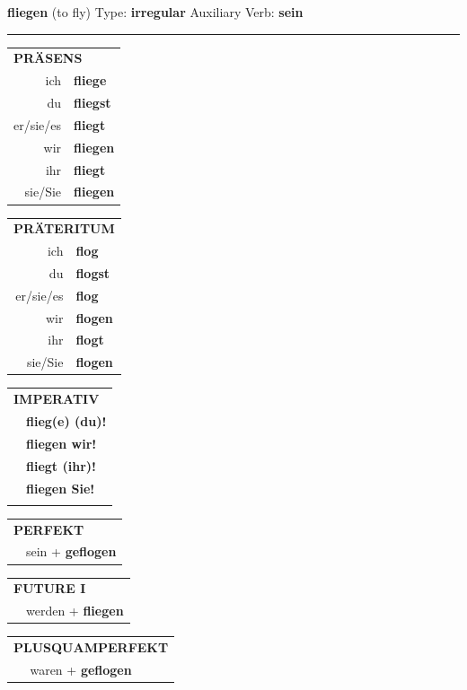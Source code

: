 \documentclass[10pt,a4paper]{revtex4-2}
\begin{document}
\begin{verbbox}
    {\Large \bf fliegen} (to fly) \hfill Type: \textbf{irregular} \hfill Auxiliary Verb: \textbf{sein} 
    
     \vspace{5pt}

    \hrule
    
    \vspace{5pt}

  \begin{tabular}{rl}
     \multicolumn{2}{l}{\textbf{PRÄSENS} }\\
    ich & \textbf{fliege}\\
    du & \textbf{fliegst}\\
    er/sie/es & \textbf{fliegt}\\
    wir & \textbf{fliegen}\\
    ihr & \textbf{fliegt}\\
    sie/Sie & \textbf{fliegen}\\
  \end{tabular}
  \hfill
     \begin{tabular}{rl}
    \multicolumn{2}{l}{\textbf{PRÄTERITUM} }\\
    ich & \textbf{flog}\\
    du & \textbf{flogst}\\
    er/sie/es & \textbf{flog}\\
    wir & \textbf{flogen}\\
    ihr & \textbf{flogt}\\
    sie/Sie & \textbf{flogen}\\
  \end{tabular}
  \hfill
  \begin{tabular}{rl}
     \multicolumn{2}{l}{\textbf{IMPERATIV} }\\
   & \textbf{flieg(e) (du)!}\\
   & \textbf{fliegen wir!}\\
   & \textbf{fliegt (ihr)!}\\
   & \textbf{fliegen Sie!}\\
   & \vspace{10pt}
  \end{tabular}

    \vspace{10pt}

 \begin{tabular}{rl}
     \multicolumn{2}{l}{\textbf{PERFEKT}}\\
   & sein + \textbf{geflogen}\\
  \end{tabular}
\hfill
   \begin{tabular}{rl}
    \multicolumn{2}{l}{\textbf{FUTURE I} }\\
   & werden + \textbf{fliegen}\\
  \end{tabular}
\hfill
   \begin{tabular}{rl}
      \multicolumn{2}{l}{\textbf{PLUSQUAMPERFEKT}}\\
   & waren + \textbf{geflogen}\\
  \end{tabular}


\end{verbbox}
\end{document}
